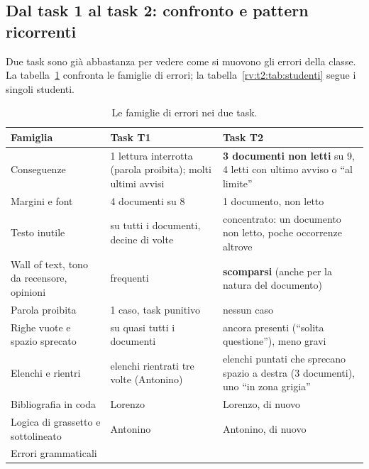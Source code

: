 \subsection{Dal task 1 al task 2: confronto e pattern ricorrenti}
\label{rv:t2:sec:confronto}

Due task sono già abbastanza per vedere come si muovono gli errori della
classe. La tabella~\ref{rv:t2:tab:famiglie} confronta le famiglie di errori;
la tabella~\ref{rv:t2:tab:studenti} segue i singoli studenti.

\begin{table}[htbp]
  \centering
  \caption{Le famiglie di errori nei due task.}
  \label{rv:t2:tab:famiglie}
  \small
  \begin{tabular}{@{}p{3.3cm}p{4.0cm}p{4.4cm}@{}}
    \toprule
    \textbf{Famiglia} & \textbf{Task T1} & \textbf{Task T2} \\
    \midrule
    Conseguenze &
      1 lettura interrotta (parola proibita); molti ultimi avvisi &
      \textbf{3 documenti non letti} su 9, 4 letti con ultimo avviso o ``al
      limite'' \\
    \addlinespace
    Margini e font &
      4 documenti su 8 &
      1 documento, non letto \\
    \addlinespace
    Testo inutile &
      su tutti i documenti, decine di volte &
      concentrato: un documento non letto, poche occorrenze altrove \\
    \addlinespace
    Wall of text, tono da recensore, opinioni &
      frequenti &
      \textbf{scomparsi} (anche per la natura del documento) \\
    \addlinespace
    Parola proibita &
      1 caso, task punitivo &
      nessun caso \\
    \addlinespace
    Righe vuote e spazio sprecato &
      su quasi tutti i documenti &
      ancora presenti (``solita questione''), meno gravi \\
    \addlinespace
    Elenchi e rientri &
      elenchi rientrati tre volte (Antonino) &
      elenchi puntati che sprecano spazio a destra (3 documenti), uno
      ``in zona grigia'' \\
    \addlinespace
    Bibliografia in coda &
      Lorenzo &
      Lorenzo, di nuovo \\
    \addlinespace
    Logica di grassetto e sottolineato &
      Antonino &
      Antonino, di nuovo \\
    \addlinespace
    Errori grammaticali &

\end{tabular}
\end{table}
